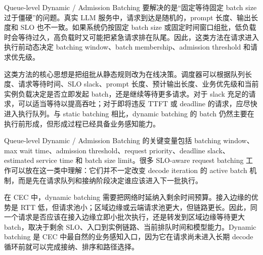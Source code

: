\documentclass[a4paper,twocolumn,10pt]{ctexart}
\begin{document}
Queue-level Dynamic / Admission Batching 要解决的是“固定等待固定 batch size 过于僵硬”的问题。真实 LLM 服务中，请求到达是随机的，prompt 长度、输出长度和 SLO 也不一致。如果系统仍按固定 batch size 或固定时间窗口组批，低负载时会等待过久，高负载时又可能把紧急请求排在队尾。因此，这类方法在请求进入执行前动态决定 batching window、batch membership、admission threshold 和请求优先级。


这类方法的核心思想是把组批从静态规则改为在线决策。调度器可以根据队列长度、请求等待时间、SLO slack、prompt 长度、预计输出长度、业务优先级和当前实例负载决定是否立即发起 batch，还是继续等待更多请求。对于 slack 充足的请求，可以适当等待以提高吞吐；对于即将违反 TTFT 或 deadline 的请求，应尽快进入执行队列。与 static batching 相比，dynamic batching 的 batch 仍然主要在执行前形成，但形成过程已经具备业务感知能力。


Queue-level Dynamic / Admission Batching 的关键变量包括 batching window、max wait time、admission threshold、request priority、deadline slack、estimated service time 和 batch size limit。很多 SLO-aware request batching 工作可以放在这一类中理解：它们并不一定改变 decode iteration 的 active batch 机制，而是先在请求队列和接纳阶段决定谁应该进入下一批执行。


在 CEC 中，dynamic batching 需要把网络时延纳入剩余时间预算。接入边缘的优势是 RTT 低，但请求池小；区域边缘或云端请求池更大，但链路更长。因此，同一个请求是否应该在接入边缘立即小批次执行，还是转发到区域边缘等待更大 batch，取决于剩余 SLO、入口到实例链路、当前排队时间和模型能力。Dynamic batching 是 CEC 中最自然的业务感知入口，因为它在请求尚未进入长期 decode 循环前就可以完成接纳、排序和路径选择。
\end{document}
